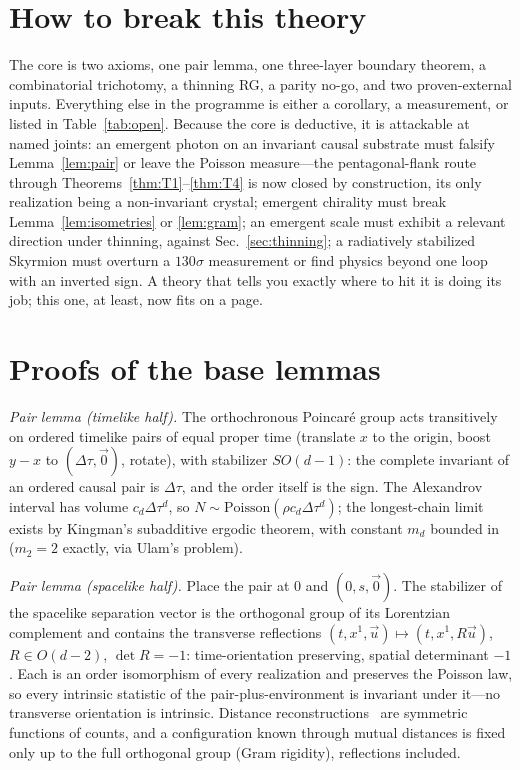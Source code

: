 \documentclass[aps,prd,reprint,nofootinbib,superscriptaddress,floatfix]{revtex4-2}
\theoremstyle{definition}
\begin{document}
\section{How to break this theory}
\label{sec:conclusion}

The core is two axioms, one pair lemma, one three-layer boundary theorem, a
combinatorial trichotomy, a thinning RG, a parity no-go, and two proven-external inputs.
Everything else in the programme is either a corollary, a measurement, or listed in
Table~\ref{tab:open}. Because the core is deductive, it is attackable at named joints:
an emergent photon on an invariant causal substrate must falsify Lemma~\ref{lem:pair} or
leave the Poisson measure---the pentagonal-flank route through
Theorems~\ref{thm:T1}--\ref{thm:T4} is now closed by construction, its only realization
being a non-invariant crystal; emergent chirality must break Lemma~\ref{lem:isometries} or
\ref{lem:gram}; an emergent scale must exhibit a relevant direction under thinning,
against Sec.~\ref{sec:thinning}; a radiatively stabilized Skyrmion must overturn a
$130\sigma$ measurement or find physics beyond one loop with an inverted sign. A theory
that tells you exactly where to hit it is doing its job; this one, at least, now fits on
a page.

\appendix

\section{Proofs of the base lemmas}
\label{app:proofs}

\emph{Pair lemma (timelike half).} The orthochronous Poincar\'e group acts transitively
on ordered timelike pairs of equal proper time (translate $x$ to the origin, boost
$y-x$ to $(\Delta\tau,\vec0)$, rotate), with stabilizer $SO(d-1)$: the complete
invariant of an ordered causal pair is $\Delta\tau$, and the order itself is the sign.
The Alexandrov interval has volume $c_d\Delta\tau^d$, so
$N\sim\mathrm{Poisson}(\rho c_d\Delta\tau^d)$; the longest-chain limit exists by
Kingman's subadditive ergodic theorem, with constant $m_d$
bounded in~\cite{BrightwellGregory1991} ($m_2=2$ exactly, via Ulam's problem).

\emph{Pair lemma (spacelike half).} Place the pair at $0$ and $(0,s,\vec0)$. The
stabilizer of the spacelike separation vector is the orthogonal group of its Lorentzian
complement and contains the transverse reflections
$(t,x^1,\vec u)\mapsto(t,x^1,R\vec u)$, $R\in O(d-2)$, $\det R=-1$: time-orientation
preserving, spatial determinant $-1$. Each is an order isomorphism of every realization
and preserves the Poisson law, so every intrinsic statistic of the pair-plus-environment
is invariant under it---no transverse orientation is intrinsic. Distance
reconstructions~\cite{RideoutWallden2009} are symmetric functions of counts, and a
configuration known through mutual distances is fixed only up to the full orthogonal
group (Gram rigidity), reflections included.
\end{document}
